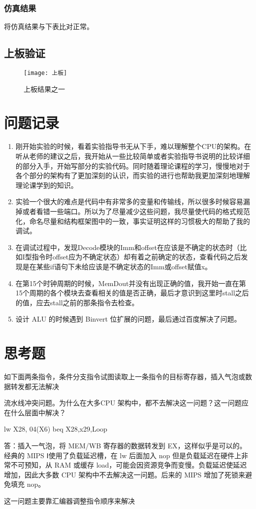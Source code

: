 \documentclass{../source/Experiment}
\begin{document}
            \subsubsection{仿真结果}
            将仿真结果与下表比对正常。
        \subsection{上板验证}
            \begin{figure}
                \centering
                \texttt{[image: 上板]}
                \caption{上板结果之一}
            \end{figure}
    \section{问题记录}
        \begin{enumerate}
            \item 刚开始实验的时候，看着实验指导书无从下手，难以理解整个CPU的架构。在听从老师的建议之后，我开始从一些比较简单或者实验指导书说明的比较详细的部分入手，开始写部分的实验代码。同时随着理论课程的学习，慢慢地对于各个部分的架构有了更加深刻的认识，而实验的进行也帮助我更加深刻地理解理论课学到的知识。
            \item 实验一个很大的难点是代码中有非常多的变量和传输线，所以很多时候容易漏掉或者看错一些端口。所以为了尽量减少这些问题，我尽量使代码的格式规范化，命名尽量和结构框架图中的一致，事实证明这样的习惯极大的帮助了我的调试。
            \item 在调试过程中，发现Decode模块的Imm和offset在应该是不确定的状态时（比如I型指令时offset应为不确定状态）却有着之前确定的状态，查看代码之后发现是在某些if语句下未给应该是不确定状态的Imm或offset赋值x。
            \item 在第15个时钟周期的时候，MemDout并没有出现正确的值，我开始一直在第15个周期的各个模块去查看相关的值是否正确，最后才意识到这里时stall之后的值，应去stall之前的那条指令去检查。
            \item 设计 ALU 的时候遇到 Binvert 位扩展的问题，最后通过百度解决了问题。
        \end{enumerate}

    \section{思考题}
    如下面两条指令，条件分支指令试图读取上一条指令的目标寄存器，插入气泡或数据转发都无法解决

    流水线冲突问题。为什么在大多CPU 架构中，都不去解决这一问题？这一问题应在什么层面中解决？
        
    lw X28, 04(X6)
    beq X28,x29,Loop

    答：插入一气泡，将 MEM/WB 寄存器的数据转发到 EX，这样似乎是可以的。经典的 MIPS Ⅰ使用了负载延迟槽，在 lw 后面加入 nop 但是负载延迟在硬件上非常不可预知，从 RAM 或缓存 load，可能会因资源竞争而变慢。负载延迟使延迟增加，因此大多数 CPU 架构中不去解决这一问题。后来的 MIPS 增加了死锁来避免填充 nop。

    这一问题主要靠汇编器调整指令顺序来解决
\end{document}

